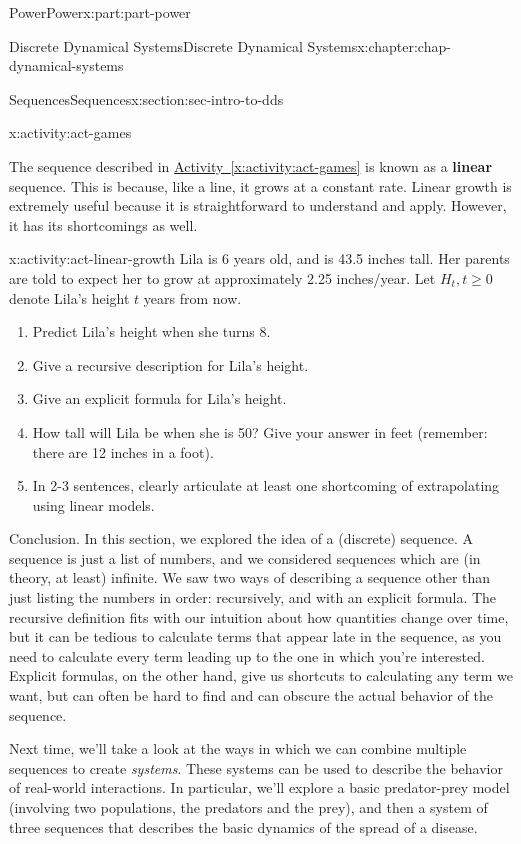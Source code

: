 \documentclass[oneside,10pt,]{book}
\newcommand{\xreffont}{\relax}
\newcommand{\terminology}[1]{\textbf{#1}}
\numberwithin{equation}{section}
\renewcommand{\ge}{\geqslant}
\begin{document}
\begin{partptx}{Power}{}{Power}{}{}{x:part:part-power}
\begin{chapterptx}{Discrete Dynamical Systems}{}{Discrete Dynamical Systems}{}{}{x:chapter:chap-dynamical-systems}
\begin{sectionptx}{Sequences}{}{Sequences}{}{}{x:section:sec-intro-to-dds}
\begin{activity}{}{x:activity:act-games}
\begin{enumerate}
\end{enumerate}
\end{activity}%
The sequence described in \hyperref[x:activity:act-games]{Activity~{\xreffont\ref{x:activity:act-games}}} is known as a \terminology{linear} sequence. This is because, like a line, it grows at a constant rate. Linear growth is extremely useful because it is straightforward to understand and apply. However, it has its shortcomings as well.%
\begin{activity}{}{x:activity:act-linear-growth}%
Lila is 6 years old, and is 43.5 inches tall. Her parents are told to expect her to grow at approximately 2.25 inches\slash{}year. Let \(H_t, t\ge 0\) denote Lila's height \(t\) years from now.%
%
\begin{enumerate}
\item{}Predict Lila's height when she turns 8.%
\item{}Give a recursive description for Lila's height.%
\item{}Give an explicit formula for Lila's height.%
\item{}How tall will Lila be when she is 50? Give your answer in feet (remember: there are 12 inches in a foot).%
\item{}In 2-3 sentences, clearly articulate at least one shortcoming of extrapolating using linear models.%
\end{enumerate}
\end{activity}%
\begin{conclusion}{Conclusion.}%
In this section, we explored the idea of a (discrete) sequence. A sequence is just a list of numbers, and we considered sequences which are (in theory, at least) infinite. We saw two ways of describing a sequence other than just listing the numbers in order: recursively, and with an explicit formula. The recursive definition fits with our intuition about how quantities change over time, but it can be tedious to calculate terms that appear late in the sequence, as you need to calculate every term leading up to the one in which you're interested. Explicit formulas, on the other hand, give us shortcuts to calculating any term we want, but can often be hard to find and can obscure the actual behavior of the sequence.%
\par
Next time, we'll take a look at the ways in which we can combine multiple sequences to create \emph{systems}. These systems can be used to describe the behavior of real-world interactions. In particular, we'll explore a basic predator-prey model (involving two populations, the predators and the prey), and then a system of three sequences that describes the basic dynamics of the spread of a disease.%

\end{conclusion}
\end{sectionptx}
\end{chapterptx}
\end{partptx}
\end{document}
